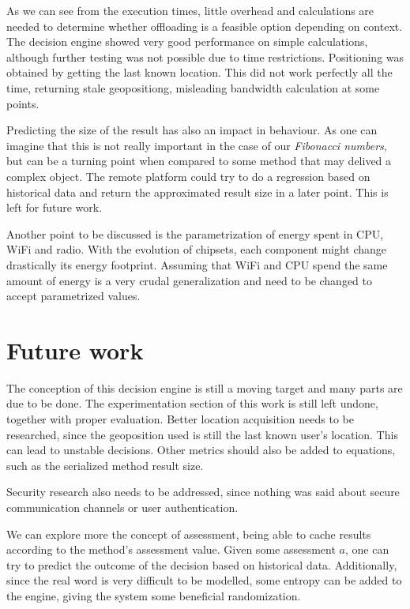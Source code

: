 \documentclass[10pt, conference, letterpaper]{IEEEtran}
\begin{document}
  As we can see from the execution times, little overhead and calculations are needed to determine whether offloading is a feasible option depending on context. The decision engine showed very good performance on simple calculations, although further testing was not possible due to time restrictions. Positioning was obtained by getting the last known location. This did not work perfectly all the time, returning stale geopositiong, misleading bandwidth calculation at some points.

  Predicting the size of the result has also an impact in behaviour. As one can imagine that this is not really important in the case of our \textit{Fibonacci numbers}, but can be a turning point when compared to some method that may delived a complex object. The remote platform could try to do a regression based on historical data and return the approximated result size in a later point. This is left for future work.

  Another point to be discussed is the parametrization of energy spent in CPU, WiFi and radio. With the evolution of chipsets, each component might change drastically its energy footprint. Assuming that WiFi and CPU spend the same amount of energy is a very crudal generalization and need to be changed to accept parametrized values. 

  \section{Future work} \label{sec:futurework}

  The conception of this decision engine is still a moving target and many parts are due to be done. The experimentation section of this work is still left undone, together with proper evaluation. Better location acquisition needs to be researched, since the geoposition used is still the last known user's location. This can lead to unstable decisions. Other metrics should also be added to equations, such as the serialized method result size.

  Security research also needs to be addressed, since nothing was said about secure communication channels or user authentication.

  We can explore more the concept of assessment, being able to cache results according to the method's assessment value. Given some assessment $a$, one can try to predict the outcome of the decision based on historical data. Additionally, since the real word is very difficult to be modelled, some entropy can be added to the engine, giving the system some beneficial randomization.  
\end{document}
